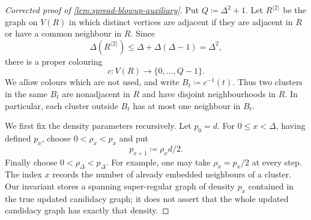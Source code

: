 \begin{proof}[Corrected proof of \cref{lem:spread-blowup-auxiliary}]
Put $Q\coloneqq \Delta^2+1$.  Let $R^{\langle 2\rangle}$ be the graph on
$V(R)$ in which distinct vertices are adjacent if they are adjacent in $R$ or
have a common neighbour in $R$.  Since
\[
    \Delta(R^{\langle 2\rangle})
        \leq \Delta+\Delta(\Delta-1)=\Delta^2,
\]
there is a proper colouring
\[
    c:V(R)\longrightarrow\{0,\dots,Q-1\}.
\]
We allow colours which are not used, and write
$B_t\coloneqq c^{-1}(t)$.  Thus two clusters in the same $B_t$ are
nonadjacent in $R$ and have disjoint neighbourhoods in $R$.  In particular,
each cluster outside $B_t$ has at most one neighbour in $B_t$.

We first fix the density parameters recursively.  Let $p_0=d$.  For
$0\leq x<\Delta$, having defined $p_x$, choose $0<\rho_x<p_x$ and put
\[
    p_{x+1}\coloneqq \rho_x d/2.
\]
Finally choose $0<\rho_\Delta<p_\Delta$.  For example, one may take
$\rho_x=p_x/2$ at every step.  The index $x$ records the number
of already embedded neighbours of a cluster.  Our invariant stores a
spanning super-regular graph of density $p_x$ contained in the true updated
candidacy graph; it does not assert that the whole updated candidacy graph
has exactly that density.


\end{proof}

